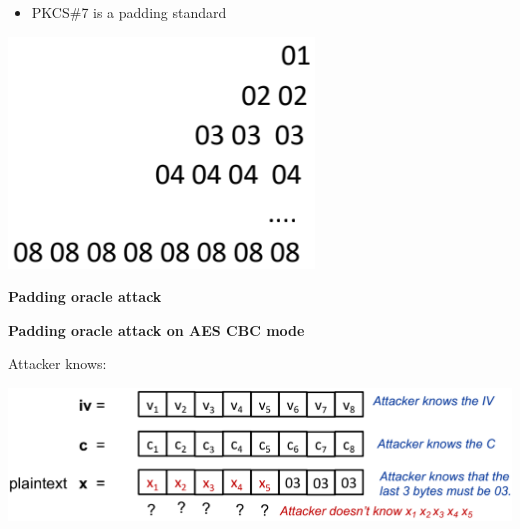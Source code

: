 \documentclass[landscape,a4paper]{extarticle}
\newenvironment{Figure}
  {\par\noindent\minipage{\linewidth}}
  {\endminipage\par\medskip}
\begin{document}
\begin{multicols*}{5}
    \begin{itemize}
        \item PKCS\#7 is a padding standard
    \end{itemize}

    \begin{Figure}
        \includegraphics[width=0.5\linewidth]{pkcs7.png}        
    \end{Figure}

    \textbf{Padding oracle attack}




    \textbf{Padding oracle attack on AES CBC mode}

    Attacker knows:

    \begin{Figure}
        \centering
        \includegraphics[width=\linewidth]{padding_oracle_attacker_knowledge.png}
    \end{Figure}


\end{multicols*}
\end{document}
